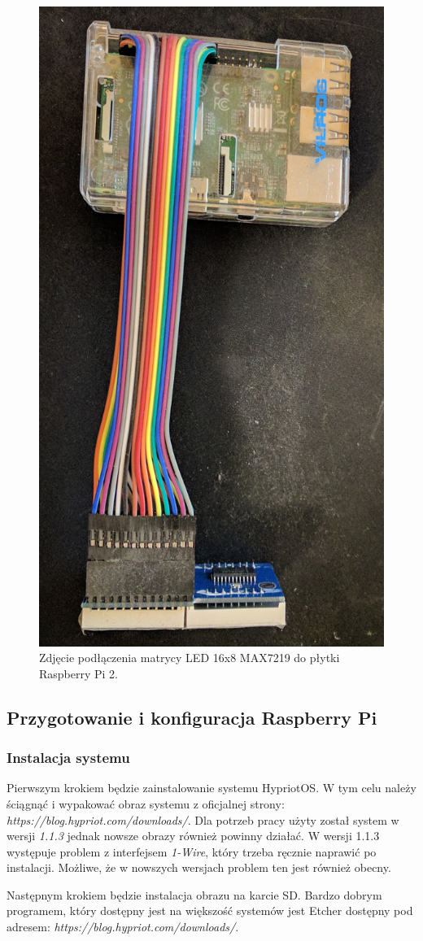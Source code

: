 \documentclass[12pt]{report}
\let\Oldsubsection\subsection
\renewcommand{\subsection}{\FloatBarrier\Oldsubsection}
\let\Oldsubsubsection\subsubsection
\renewcommand{\subsubsection}{\FloatBarrier\Oldsubsubsection}
\begin{document}
{\begin{figure}[h]
	\centering
	\includegraphics[height=1\textwidth]{images/rpi-node.jpg}
	\caption{Zdjęcie podłączenia matrycy LED 16x8 MAX7219 do płytki Raspberry Pi 2.}
\end{figure}
\FloatBarrier	
\subsection{Przygotowanie i konfiguracja Raspberry Pi}
\subsubsection{Instalacja systemu}
Pierwszym krokiem będzie zainstalowanie systemu HypriotOS. W tym celu należy ściągnąć i wypakować obraz systemu z oficjalnej strony: \textit{https://blog.hypriot.com/downloads/}. Dla potrzeb pracy użyty został system w wersji \textit{1.1.3} jednak nowsze obrazy również powinny działać. W wersji 1.1.3 występuje problem z interfejsem \textit{1-Wire}, który trzeba ręcznie naprawić po instalacji. Możliwe, że w nowszych wersjach problem ten jest również obecny.

Następnym krokiem będzie instalacja obrazu na karcie SD. Bardzo dobrym programem, który dostępny jest na większość systemów jest Etcher dostępny pod adresem: \textit{https://blog.hypriot.com/downloads/}.

}
\end{document}
